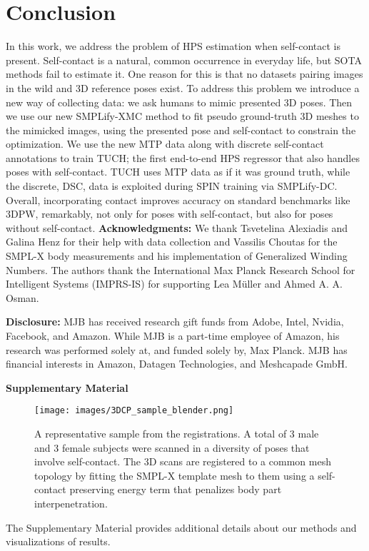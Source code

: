 \documentclass[final]{cvpr}
\newcommand{\smplifyxmc}{\mbox{SMPLify-XMC}\xspace}
\newcommand{\smplifyxdc}{\mbox{SMPLify-DC}\xspace}
\theoremstyle{definition}
\begin{document}
 	\section{Conclusion}
In this work, we address the problem of HPS estimation when self-contact is present. Self-contact is a natural, common occurrence in 
everyday life, but SOTA methods fail to estimate it. One reason for this is that no datasets pairing images in the wild and 3D reference poses exist. 
To address this problem we introduce a new way of collecting data: we ask humans to mimic presented 3D poses. Then we use our new \smplifyxmc method to
fit pseudo ground-truth 3D meshes to the mimicked images, using the presented pose and self-contact to constrain the optimization. We use the new MTP data
along with discrete self-contact annotations to train TUCH; the first end-to-end HPS regressor that also handles poses with self-contact. TUCH uses MTP data 
as if it was ground truth, while the discrete, DSC, data is exploited  during SPIN training via \smplifyxdc. Overall, incorporating contact improves accuracy 
on standard benchmarks like 3DPW, remarkably, not only for poses with self-contact, but also for poses without self-contact.  	
\textbf{Acknowledgments:} We thank Tsvetelina Alexiadis and  Galina Henz for their help with data collection and Vassilis Choutas for the SMPL-X body measurements and his implementation of Generalized Winding Numbers. The authors thank the International Max Planck Research School for Intelligent Systems (IMPRS-IS) for supporting Lea M\"uller and Ahmed A. A. Osman.
	
\textbf{Disclosure:}
	MJB has received research gift funds from Adobe, Intel, Nvidia, Facebook, and Amazon. While MJB is a part-time employee of Amazon, his research was performed solely at, and funded solely by, Max Planck. MJB has financial interests in Amazon, Datagen Technologies, and Meshcapade GmbH.

	{\small
		
		\balance
		
	}

	\newpage
	\appendix
	{\noindent\Large\textbf{Supplementary Material}}
	\newline
	\setcounter{page}{1}
			
	\begin{figure*}[h!]
	\texttt{[image: images/3DCP\_sample\_blender.png]}
	\caption{A representative sample from the registrations. A total of 3 male and 3 female subjects were scanned in a diversity of poses that involve self-contact. The 3D scans are registered to a common mesh topology by fitting the SMPL-X template mesh to them using a self-contact preserving energy term that penalizes body part interpenetration.}
	\label{fig:3dcp}
\end{figure*}
The Supplementary Material provides additional details about our methods and visualizations of results.
\end{document}
